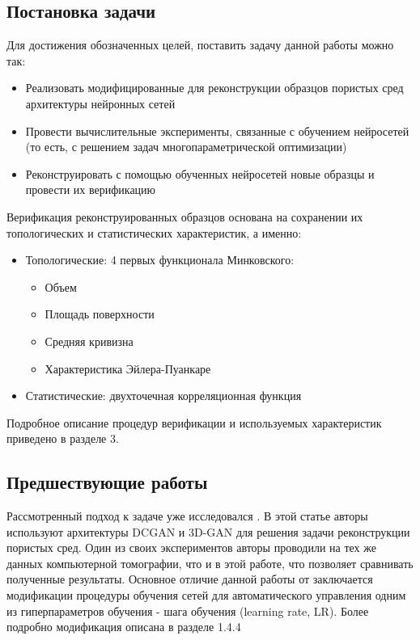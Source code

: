 	\subsection*{Постановка задачи}
	
	Для достижения обозначенных целей, поставить задачу данной работы можно так:
	
	\begin{itemize}
		\item Реализовать модифицированные для реконструкции образцов пористых сред архитектуры нейронных сетей
		\item Провести вычислительные эксперименты, связанные с обучением нейросетей (то есть, с решением задач многопараметрической оптимизации)
		\item Реконструировать с помощью обученных нейросетей новые образцы и провести их верификацию
	\end{itemize}

	Верификация реконструированных образцов основана на сохранении их топологических и статистических характеристик, а именно:
	
	\begin{itemize}
		\item Топологические: 4 первых функционала Минковского:
		\begin{itemize}
			\item Объем
			\item Площадь поверхности
			\item Средняя кривизна
			\item Характеристика Эйлера-Пуанкаре
		\end{itemize}
		\item Статистические: двухточечная корреляционная функция
	\end{itemize}

	Подробное описание процедур верификации и используемых характеристик приведено в разделе 3.
	
	\subsection*{Предшествующие работы}
		Рассмотренный подход к задаче уже исследовался \cite{Mosser}. В этой статье авторы используют архитектуры DCGAN \cite{Radford} и 3D-GAN \cite{Wu} для решения задачи реконструкции пористых сред. Один из своих экспериментов авторы проводили на тех же данных компьютерной томографии, что и в этой работе, что позволяет сравнивать полученные результаты. Основное отличие данной работы от \cite{Mosser} заключается модификации процедуры обучения сетей для автоматического управления одним из гиперпараметров обучения - шага обучения (learning rate, LR). Более подробно модификация описана в разделе 1.4.4